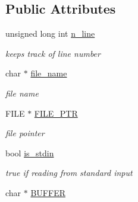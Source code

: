 \subsection*{Public Attributes}
\begin{CompactItemize}
\item 
\hypertarget{classFileBuffer_b91de85b7f0eab77697c680346c4f61d}{
unsigned long int \hyperlink{classFileBuffer_b91de85b7f0eab77697c680346c4f61d}{n\_\-line}}
\label{classFileBuffer_b91de85b7f0eab77697c680346c4f61d}

\begin{CompactList}\small\item\em keeps track of line number \item\end{CompactList}\item 
\hypertarget{classFileBuffer_416474b62bf29cc6e44dbb3d7db5fb2a}{
char $\ast$ \hyperlink{classFileBuffer_416474b62bf29cc6e44dbb3d7db5fb2a}{file\_\-name}}
\label{classFileBuffer_416474b62bf29cc6e44dbb3d7db5fb2a}

\begin{CompactList}\small\item\em file name \item\end{CompactList}\item 
\hypertarget{classFileBuffer_ef9398116185fc3314424ed2c68b7854}{
FILE $\ast$ \hyperlink{classFileBuffer_ef9398116185fc3314424ed2c68b7854}{FILE\_\-PTR}}
\label{classFileBuffer_ef9398116185fc3314424ed2c68b7854}

\begin{CompactList}\small\item\em file pointer \item\end{CompactList}\item 
\hypertarget{classFileBuffer_8e4c0122ac4352e5a930248f982da2ca}{
bool \hyperlink{classFileBuffer_8e4c0122ac4352e5a930248f982da2ca}{is\_\-stdin}}
\label{classFileBuffer_8e4c0122ac4352e5a930248f982da2ca}

\begin{CompactList}\small\item\em true if reading from standard input \item\end{CompactList}\item 
\hypertarget{classFileBuffer_f93bf5b014aac504fca11ab6a2d59fb0}{
char $\ast$ \hyperlink{classFileBuffer_f93bf5b014aac504fca11ab6a2d59fb0}{BUFFER}}
\label{classFileBuffer_f93bf5b014aac504fca11ab6a2d59fb0}


\end{CompactItemize}
